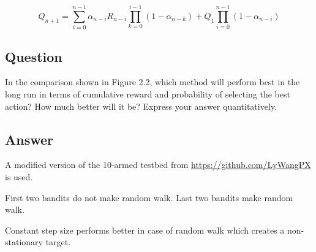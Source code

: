 \documentclass{article}
\begin{document}
    \begin{equation}
        Q_{n+1}=\sum_{i=0}^{n-1} \alpha_{n-i}R_{n-i} \prod_{k=0}^{i-1}(1-\alpha_{n-k}) + Q_1 \prod_{i=0}^{n-1}(1-\alpha_{n-i})
    \end{equation}

    \subsection{Question}

    In the comparison shown in Figure 2.2, which method will perform best in the long run in
    terms of cumulative reward and probability of selecting the best action? How much better will it be?
    Express your answer quantitatively.

    \subsection*{Answer}
    A modified version of the 10-armed testbed from \href{https://github.com/LyWangPX/Reinforcement-Learning-2nd-Edition-by-Sutton-Exercise-Solutions}{https://github.com/LyWangPX} is used.

    First two bandits do not make random walk. Last two bandits make random walk.

    Constant step size performs better in case of random walk which creates a non-stationary target.
\end{document}
